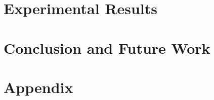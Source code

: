 \documentclass{article}
\begin{document}
\section{Experimental Results}


\section{Conclusion and Future Work}


\pagebreak
{}
{}
 


\pagebreak
{}
{}
\section*{Appendix}
\end{document}

